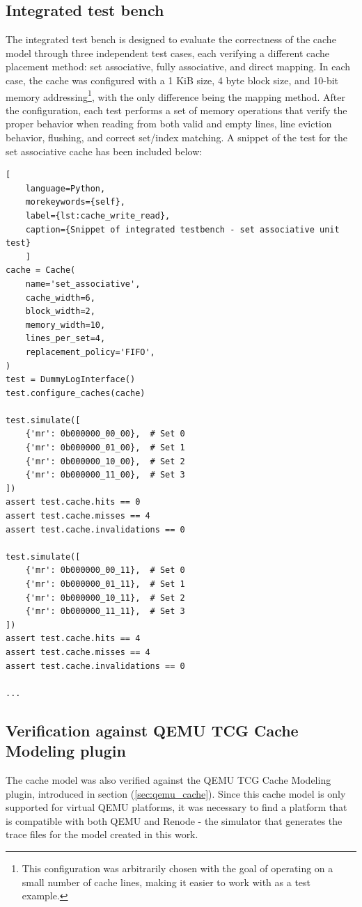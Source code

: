 \subsection{Integrated test bench}
The integrated test bench is designed to evaluate the correctness of the cache model through three independent test cases, each verifying a different cache placement method:
set associative, fully associative, and direct mapping. In each case, the cache was configured with a 1 KiB size, 4 byte block size, and 10-bit memory addressing\footnote{This
configuration was arbitrarily chosen with the goal of operating on a small number of cache lines, making it easier to work with as a test example.}, with the only difference
being the mapping method. After the configuration, each test performs a set of memory operations that verify the proper behavior when reading from both valid and empty lines, line
eviction behavior, flushing, and correct set/index matching. A snippet of the test for the set associative cache has been included below:

\begin{center}
\centering
\begin{minipage}{\linewidth}
\begin{lstlisting}[
    language=Python,
	morekeywords={self},
    label={lst:cache_write_read},
    caption={Snippet of integrated testbench - set associative unit test}
    ]
cache = Cache(
    name='set_associative',
    cache_width=6,
    block_width=2,
    memory_width=10,
    lines_per_set=4,
    replacement_policy='FIFO',
)
test = DummyLogInterface()
test.configure_caches(cache)

test.simulate([
    {'mr': 0b000000_00_00},  # Set 0
    {'mr': 0b000000_01_00},  # Set 1
    {'mr': 0b000000_10_00},  # Set 2
    {'mr': 0b000000_11_00},  # Set 3
])
assert test.cache.hits == 0
assert test.cache.misses == 4
assert test.cache.invalidations == 0

test.simulate([
    {'mr': 0b000000_00_11},  # Set 0
    {'mr': 0b000000_01_11},  # Set 1
    {'mr': 0b000000_10_11},  # Set 2
    {'mr': 0b000000_11_11},  # Set 3
])
assert test.cache.hits == 4
assert test.cache.misses == 4
assert test.cache.invalidations == 0

...
\end{lstlisting}
\end{minipage}
\end{center}

\subsection{Verification against QEMU TCG Cache Modeling plugin}
The cache model was also verified against the QEMU TCG Cache Modeling plugin, introduced in section (\ref{sec:qemu_cache}).
Since this cache model is only supported for virtual QEMU platforms, it was necessary to find a platform that is compatible with both QEMU and Renode - the simulator that generates
the trace files for the model created in this work.

